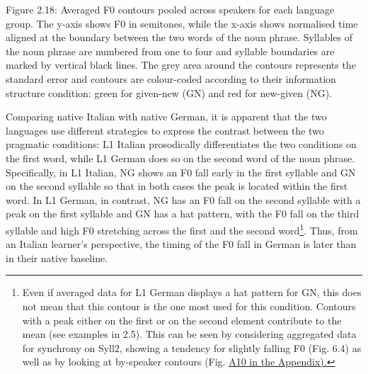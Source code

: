 \begin{styleStandard}
  [Warning: Image ignored] %
 
\end{styleStandard}

\begin{stylecaption}
Figure 2.18: Averaged F0 contours pooled across speakers for each language group. The y-axis shows F0 in semitones, while the x-axis shows normalised time aligned at the boundary between the two words of the noun phrase. Syllables of the noun phrase are numbered from one to four and syllable boundaries are marked by vertical black lines. The grey area around the contours represents the standard error and contours are colour-coded according to their information structure condition: green for given-new (GN) and red for new-given (NG).
\end{stylecaption}

\begin{styleStandard}
Comparing native Italian with native German, it is apparent that the two languages use different strategies to express the contrast between the two pragmatic conditions: L1 Italian prosodically differentiates the two conditions on the first word, while L1 German does so on the second word of the noun phrase. Specifically, in L1 Italian, NG shows an F0 fall early in the first syllable and GN on the second syllable so that in both cases the peak is located within the first word. In L1 German, in contrast, NG has an F0 fall on the second syllable with a peak on the first syllable and GN has a hat pattern, with the F0 fall on the third syllable and high F0 stretching across the first and the second word\footnote{Even if averaged data for L1 German displays a hat pattern for GN, this does not mean that this contour is the one most used for this condition. Contours with a peak either on the first or on the second element contribute to the mean (see examples in 2.5). This can be seen by considering aggregated data for synchrony on Syll2, showing a tendency for slightly falling F0 (Fig. 6.4) as well as by looking at by-speaker contours (Fig. \hyperlink{bookmark210}{A10 in the Appendix).}}. Thus, from an Italian learner’s perspective, the timing of the F0 fall in German is later than in their native baseline.
\end{styleStandard}

